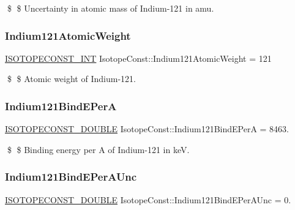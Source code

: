 \$ \$ Uncertainty in atomic mass of Indium-\/121 in amu. \mbox{\label{group___isotope_const-_indium-_in121_gac07705b936f407eb57ac04b1091de10c}} 
\subsubsection{\texorpdfstring{Indium121\+Atomic\+Weight}{Indium121AtomicWeight}}
{\footnotesize\ttfamily \mbox{\hyperlink{group___isotope_const-_macros_ga5f18360b3e99483a35c32d789e62621c}{I\+S\+O\+T\+O\+P\+E\+C\+O\+N\+S\+T\+\_\+\+I\+NT}} Isotope\+Const\+::\+Indium121\+Atomic\+Weight = 121}

\$ \$ Atomic weight of Indium-\/121. \mbox{\label{group___isotope_const-_indium-_in121_ga4e9a2d4ba636f79ee86bd941273569e8}} 
\subsubsection{\texorpdfstring{Indium121\+Bind\+E\+PerA}{Indium121BindEPerA}}
{\footnotesize\ttfamily \mbox{\hyperlink{group___isotope_const-_macros_ga8f45a7272ce02c0b4c65c44636ed719a}{I\+S\+O\+T\+O\+P\+E\+C\+O\+N\+S\+T\+\_\+\+D\+O\+U\+B\+LE}} Isotope\+Const\+::\+Indium121\+Bind\+E\+PerA = 8463.}

\$ \$ Binding energy per A of Indium-\/121 in keV. \mbox{\label{group___isotope_const-_indium-_in121_gaa139289ee61b43d7f673acde07ba1a41}} 
\subsubsection{\texorpdfstring{Indium121\+Bind\+E\+Per\+A\+Unc}{Indium121BindEPerAUnc}}
{\footnotesize\ttfamily \mbox{\hyperlink{group___isotope_const-_macros_ga8f45a7272ce02c0b4c65c44636ed719a}{I\+S\+O\+T\+O\+P\+E\+C\+O\+N\+S\+T\+\_\+\+D\+O\+U\+B\+LE}} Isotope\+Const\+::\+Indium121\+Bind\+E\+Per\+A\+Unc = 0.}

